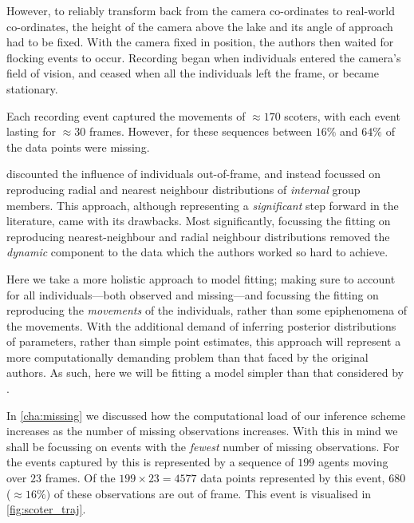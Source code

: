 However, to reliably transform back from the camera co-ordinates to real-world
co-ordinates, the height of the camera above the lake and its angle of approach
had to be fixed. With the camera fixed in position, the authors then waited for
flocking events to occur. Recording began when individuals entered the camera's
field of vision, and ceased when all the individuals left the frame, or became
stationary.

Each recording event captured the movements of $\approx170$ scoters,
with each event lasting for $\approx30$ frames. However, for these sequences
between $16\%$ and $64\%$ of the data points were missing.

\textcite{lukeman10} discounted the influence of individuals out-of-frame, and
instead focussed on reproducing radial and nearest neighbour distributions of
\emph{internal} group members. This approach, although representing a
\emph{significant} step forward in the literature, came with its drawbacks.
Most significantly, focussing the fitting on reproducing nearest-neighbour and
radial neighbour distributions removed the \emph{dynamic} component to the data
which the authors worked so hard to achieve.

Here we take a more holistic approach to model fitting; making sure to account
for all individuals---both observed and missing---and focussing the fitting on
reproducing the \emph{movements} of the individuals, rather than some
epiphenomena of the movements. With the additional demand of inferring
posterior distributions of parameters, rather than simple point estimates, this
approach will represent a more computationally demanding problem than that
faced by the original authors. As such, here we will be fitting a model simpler
than that considered by \textcite{lukeman10}.

In \cref{cha:missing} we discussed how the computational load of our inference
scheme increases as the number of missing observations increases. With this in
mind we shall be focussing on events with the \emph{fewest} number of missing
observations. For the events captured by \textcite{lukeman10} this is
represented by a sequence of $199$ agents moving over $23$ frames. Of the
$199\times23=4577$ data points represented by this event, $680$ ($\approx16\%)$
of these observations are out of frame. This event is visualised in
\cref{fig:scoter_traj}.

